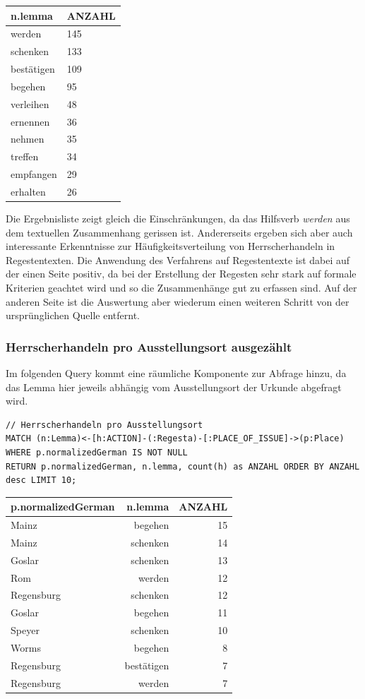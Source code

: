 \documentclass[12pt,ngerman,]{article}
\begin{document}
\begin{longtable}[]{@{}ll@{}}
\toprule
n.lemma & ANZAHL\tabularnewline
\midrule
\endhead
werden & 145\tabularnewline
schenken & 133\tabularnewline
bestätigen & 109\tabularnewline
begehen & 95\tabularnewline
verleihen & 48\tabularnewline
ernennen & 36\tabularnewline
nehmen & 35\tabularnewline
treffen & 34\tabularnewline
empfangen & 29\tabularnewline
erhalten & 26\tabularnewline
\bottomrule
\end{longtable}

Die Ergebnisliste zeigt gleich die Einschränkungen, da das Hilfsverb
\emph{werden} aus dem textuellen Zusammenhang gerissen ist. Andererseits
ergeben sich aber auch interessante Erkenntnisse zur
Häufigkeitsverteilung von Herrscherhandeln in Regestentexten. Die
Anwendung des Verfahrens auf Regestentexte ist dabei auf der einen Seite
positiv, da bei der Erstellung der Regesten sehr stark auf formale
Kriterien geachtet wird und so die Zusammenhänge gut zu erfassen sind.
Auf der anderen Seite ist die Auswertung aber wiederum einen weiteren
Schritt von der ursprünglichen Quelle entfernt.

\subsubsection{Herrscherhandeln pro Ausstellungsort
ausgezählt}\label{herrscherhandeln-pro-ausstellungsort-ausgezuxe4hlt}

Im folgenden Query kommt eine räumliche Komponente zur Abfrage hinzu, da
das Lemma hier jeweils abhängig vom Ausstellungsort der Urkunde
abgefragt wird.

\begin{verbatim}
// Herrscherhandeln pro Ausstellungsort
MATCH (n:Lemma)<-[h:ACTION]-(:Regesta)-[:PLACE_OF_ISSUE]->(p:Place)
WHERE p.normalizedGerman IS NOT NULL
RETURN p.normalizedGerman, n.lemma, count(h) as ANZAHL ORDER BY ANZAHL desc LIMIT 10;
\end{verbatim}

\begin{longtable}[]{@{}lrr@{}}
\toprule
p.normalizedGerman & n.lemma & ANZAHL\tabularnewline
\midrule
\endhead
Mainz & begehen & 15\tabularnewline
Mainz & schenken & 14\tabularnewline
Goslar & schenken & 13\tabularnewline
Rom & werden & 12\tabularnewline
Regensburg & schenken & 12\tabularnewline
Goslar & begehen & 11\tabularnewline
Speyer & schenken & 10\tabularnewline
Worms & begehen & 8\tabularnewline
Regensburg & bestätigen & 7\tabularnewline
Regensburg & werden & 7\tabularnewline
\bottomrule
\end{longtable}
\end{document}
